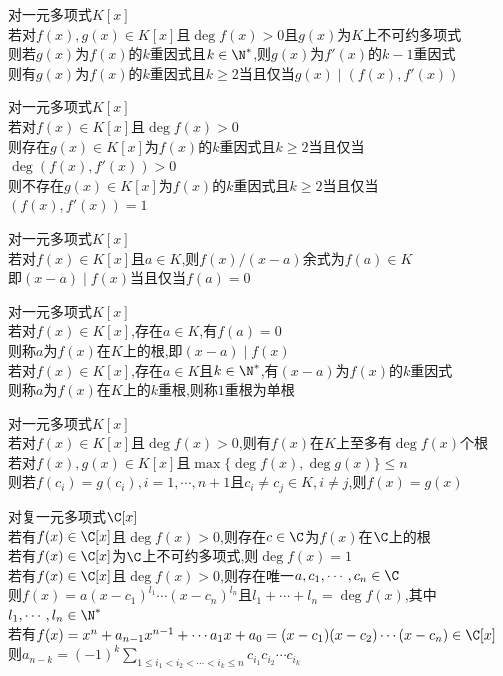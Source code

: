 \begin{dingli}
对一元多项式$K[x]$\\
若对$f(x),g(x)\in K[x]$且$\deg f(x)>0$且$g(x)$为$K$上不可约多项式\\
则若$g(x)$为$f(x)$的$k$重因式且$k\in\N^*$,则$g(x)$为$f'(x)$的$k-1$重因式\\
则有$g(x)$为$f(x)$的$k$重因式且$k\geq 2$当且仅当$g(x)\mid (f(x),f'(x))$
\end{dingli}

\begin{dingli}
对一元多项式$K[x]$\\
若对$f(x)\in K[x]$且$\deg f(x)>0$\\
则存在$g(x)\in K[x]$为$f(x)$的$k$重因式且$k\geq 2$当且仅当$\deg (f(x),f'(x))>0$\\
则不存在$g(x)\in K[x]$为$f(x)$的$k$重因式且$k\geq 2$当且仅当$(f(x),f'(x))=1$
\end{dingli}

\begin{dingli}
对一元多项式$K[x]$\\
若对$f(x)\in K[x]$且$a\in K$,则$f(x)/(x-a)$余式为$f(a)\in K$\\
即$(x-a)\mid f(x)$当且仅当$f(a)=0$
\end{dingli}

\begin{dingyi}
对一元多项式$K[x]$\\
若对$f(x)\in K[x]$,存在$a\in K$,有$f(a)=0$\\
则称$a$为$f(x)$在$K$上的根,即$(x-a)\mid f(x)$\\
若对$f(x)\in K[x]$,存在$a\in K$且$k\in\N^*$,有$(x-a)$为$f(x)$的$k$重因式\\
则称$a$为$f(x)$在$K$上的$k$重根,则称$1$重根为单根
\end{dingyi}

\begin{dingli}
对一元多项式$K[x]$\\
若对$f(x)\in K[x]$且$\deg f(x)>0$,则有$f(x)$在$K$上至多有$\deg f(x)$个根\\
若对$f(x),g(x)\in K[x]$且$\max\{\deg f(x),\deg g(x)\}\leq n$\\
则若$f(c_i)=g(c_i), i=1,\cdots,n+1$且$c_i\neq c_j\in K,i\neq j$,则$f(x)=g(x)$
\end{dingli}

\begin{dingli}
对复一元多项式$\C[x]$\\
若有$f(x)\in \C[x]$且$\deg f(x)>0$,则存在$c\in\C$为$f(x)$在$\C$上的根\\
若有$f(x)\in \C[x]$为$\C$上不可约多项式,则$\deg f(x)=1$\\
若有$f(x)\in \C[x]$且$\deg f(x)>0$,则存在唯一$a,c_1,\cdots,c_n\in \C$\\
则$f(x)=a(x-c_1)^{l_1}\cdots (x-c_n)^{l_n}$且$l_1+\cdots+l_n=\deg f(x)$,其中$l_1,\cdots,l_n\in \N^*$\\
若有$f(x)=x^n+a_{n-1}x^{n-1}+\cdots a_1x+a_0=(x-c_1)(x-c_2)\cdots (x-c_n)\in\C[x]$\\
则$a_{n-k}=(-1)^{k}\sum\limits_{1\leq i_1<i_2<\cdots<i_{k}\leq n}c_{i_1}c_{i_2}\cdots c_{i_k}$
\end{dingli}

